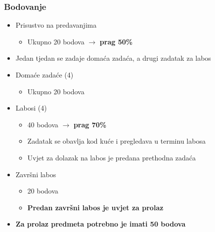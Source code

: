 \documentclass[t]{beamer}
\begin{document}
\begin{frame}
	\frametitle{Bodovanje}
	\begin{itemize}
		\item Prisustvo na predavanjima
		\begin{itemize}
			\item Ukupno 20 bodova $\rightarrow$ \textbf{prag 50\%}
		\end{itemize}
		\item Jedan tjedan se zadaje domaća zadaća, a drugi zadatak za labos
		\item Domaće zadaće (4)
		\begin{itemize}
			\item Ukupno 20 bodova
		\end{itemize}
		\item Labosi (4)
		\begin{itemize}
			\item 40 bodova $\rightarrow$ \textbf{prag 70\%}
			\item Zadatak se obavlja kod kuće i pregledava u terminu labosa
			\item Uvjet za dolazak na labos je predana prethodna zadaća
		\end{itemize}
		\item Završni labos
		\begin{itemize}
			\item 20 bodova
			\item \textbf{Predan završni labos je uvjet za prolaz}
		\end{itemize}
		\item \textbf{Za prolaz predmeta potrebno je imati 50 bodova}
	\end{itemize}
\end{frame}
\end{document}
